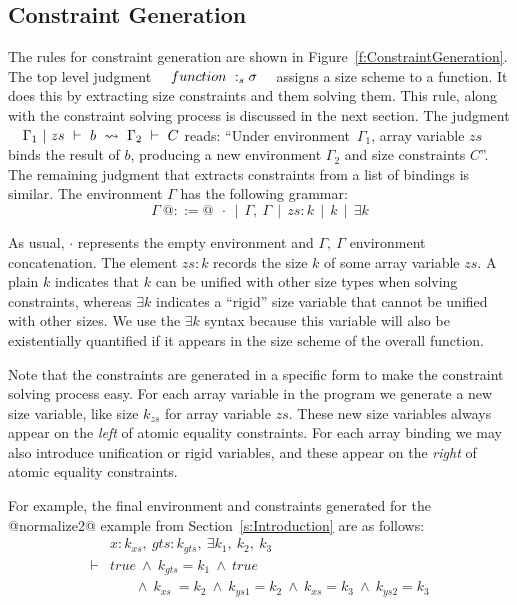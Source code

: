 \subsection{Constraint Generation}
The rules for constraint generation are shown in Figure~\ref{f:ConstraintGeneration}. The top level judgment ~~$function ~:_{s} \sigma$~~ assigns a size scheme to a function. It does this by extracting size constraints and them solving them. This rule, along with the constraint solving process is discussed in the next section. The judgment ~~$\Gamma_1 ~|~ zs ~\vdash~ b ~\leadsto~ \Gamma_2 ~\vdash~ C$ reads: ``Under environment~$\Gamma_1$, array variable $zs$ binds the result of $b$, producing a new environment $\Gamma_2$ and size constraints $C$''. The remaining judgment that extracts constraints from a list of bindings is similar. The environment $\Gamma$ has the following grammar:
$$
\Gamma~ @::=@ ~~\cdot ~~|~~ \Gamma,~ \Gamma ~~|~~ zs : k ~~|~~ k ~~|~~ \exists k
$$

As usual, $\cdot$ represents the empty environment and  $\Gamma,~ \Gamma$ environment concatenation. The element $zs : k$ records the size $k$ of some array variable $zs$. A plain $k$ indicates that $k$ can be unified with other size types when solving constraints, whereas $\exists k$ indicates a ``rigid'' size variable that cannot be unified with other sizes. We use the $\exists k$ syntax because this variable will also be existentially quantified if it appears in the size scheme of the overall function.

Note that the constraints are generated in a specific form to make the constraint solving process easy. For each array variable in the program we generate a new size variable, like size $k_{zs}$ for array variable $zs$. These new size variables always appear on the \emph{left} of atomic equality constraints. For each array binding we may also introduce unification or rigid variables, and these appear on the \emph{right} of atomic equality constraints.

For example, the final environment and constraints generated for the @normalize2@ example from Section~\ref{s:Introduction} are as follows:
$$
\begin{array}{ll}
       & x : k_{xs},~ gts : k_{gts},~ \exists k_1,~ k_2,~ k_3 
\\
\vdash & true 
        ~\wedge~  k_{gts} = k_1
        ~\wedge~  true
\\     &~~~~~~~~ 
          \wedge~  k_{xs}  ~= k_2
        ~ \wedge~  k_{ys1}  = k_2 
        ~ \wedge~  k_{xs}   = k_3
        ~ \wedge~  k_{ys2}  = k_3
\end{array}
$$


